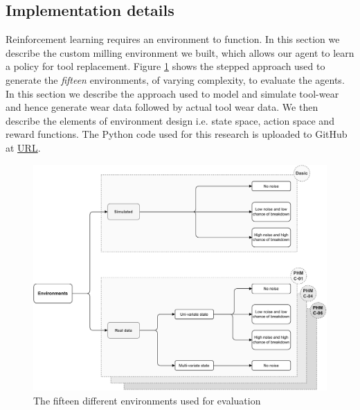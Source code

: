 \documentclass[a4paper, 12pt]{article}
\begin{document}
\subsection{Implementation details}\label{sec:Implementation}
Reinforcement learning requires an environment to function. In this section we describe the custom milling environment we built, which allows our agent to learn a policy for tool replacement. Figure \ref{fig:environments} shows the stepped approach used to generate the \textit{fifteen} environments, of varying complexity, to evaluate the agents. In this section we describe the approach used to model and simulate tool-wear and hence generate wear data followed by actual tool wear data. We then describe the elements of environment design i.e. state space, action space and reward functions. The Python code used for this research is uploaded to GitHub at \href{https://github.com/Rajesh-Siraskar/Empirical_Study_REINFORCE}{URL}.  %
\begin{figure}[ht]
	\centering
	\includegraphics[width=\textwidth]{Environments.pdf}  
	\caption{The fifteen different environments used for evaluation}
	\label{fig:environments}
\end{figure} 
\end{document}
